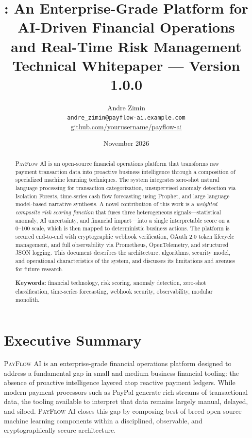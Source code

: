 \documentclass[11pt,a4paper]{article}
\title{%
  \vspace{-2cm}
  {\LARGE\bfseries \payflow: An Enterprise-Grade Platform for\\[0.3em]
  AI-Driven Financial Operations and Real-Time Risk Management}\\[1em]
  \large Technical Whitepaper --- Version 1.0.0
}
\author{%
  Andre Zimin\\[0.5em]
  \small \texttt{andre_zimin@payflow-ai.example.com}\\[0.3em]
  \small \href{https://github.com/yourusername/payflow-ai}{github.com/yourusername/payflow-ai}
}
\date{November 2026}
\newcommand{\payflow}{\textsc{PayFlow AI}}
\begin{document}
\maketitle
\thispagestyle{empty}

\vspace{1cm}

\begin{abstract}
\noindent
\payflow{} is an open-source financial operations platform that transforms raw payment transaction data into proactive business intelligence through a composition of specialized machine learning techniques. The system integrates zero-shot natural language processing for transaction categorization, unsupervised anomaly detection via Isolation Forests, time-series cash flow forecasting using Prophet, and large language model-based narrative synthesis. A novel contribution of this work is a \emph{weighted composite risk scoring function} that fuses three heterogeneous signals---statistical anomaly, AI uncertainty, and financial impact---into a single interpretable score on a 0--100 scale, which is then mapped to deterministic business actions. The platform is secured end-to-end with cryptographic webhook verification, OAuth 2.0 token lifecycle management, and full observability via Prometheus, OpenTelemetry, and structured JSON logging. This document describes the architecture, algorithms, security model, and operational characteristics of the system, and discusses its limitations and avenues for future research.

\vspace{0.5em}
\noindent\textbf{Keywords:} financial technology, risk scoring, anomaly detection, zero-shot classification, time-series forecasting, webhook security, observability, modular monolith.
\end{abstract}

\newpage
\tableofcontents
\newpage
\listoffigures
\listoftables
\newpage
\setcounter{page}{1}


\section*{Executive Summary}

\payflow{} is an enterprise-grade financial operations platform designed to address a fundamental gap in small and medium business financial tooling: the absence of proactive intelligence layered atop reactive payment ledgers. While modern payment processors such as PayPal generate rich streams of transactional data, the tooling available to interpret that data remains largely manual, delayed, and siloed. \payflow{} closes this gap by composing best-of-breed open-source machine learning components within a disciplined, observable, and cryptographically secure architecture.
\end{document}
